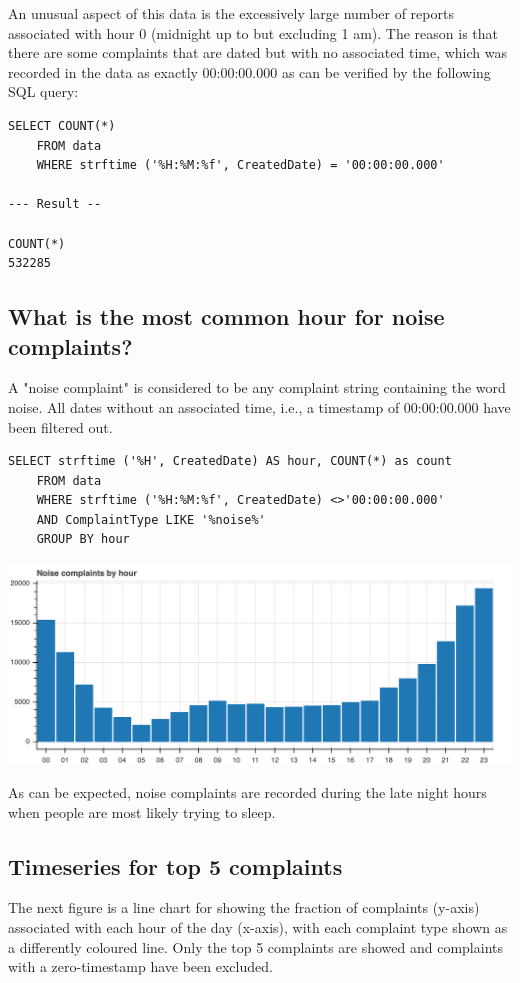 \documentclass[12pt,a4paper]{article}
\begin{document}
An unusual aspect of this data is the excessively large number of reports associated with hour 0 (midnight up to but excluding 1 am). The reason is that there are some complaints that are dated but with no associated time, which was recorded in the data as exactly 00:00:00.000 as can be verified by the following SQL query:

\begin{verbatim}
SELECT COUNT(*)
    FROM data
    WHERE strftime ('%H:%M:%f', CreatedDate) = '00:00:00.000'

--- Result --

COUNT(*)
532285
\end{verbatim}


\subsection{What is the most common hour for noise complaints?}
A "noise complaint" is considered to be any complaint string containing the word noise. All dates without an associated time, i.e., a timestamp of 00:00:00.000 have been filtered out.

\begin{verbatim}
SELECT strftime ('%H', CreatedDate) AS hour, COUNT(*) as count
    FROM data
    WHERE strftime ('%H:%M:%f', CreatedDate) <>'00:00:00.000'
    AND ComplaintType LIKE '%noise%'
    GROUP BY hour
\end{verbatim}

\includegraphics[scale=0.3]{noisecomplaintsbyhour}

As can be expected, noise complaints are recorded during the late night hours when people are most likely trying to sleep.

\subsection{Timeseries for top 5 complaints}
The next figure is a line chart for showing the fraction of complaints (y-axis) associated with each hour of the day (x-axis), with each complaint type shown as a differently coloured line. Only the top 5 complaints are showed and complaints with a zero-timestamp have been excluded.
\end{document}
